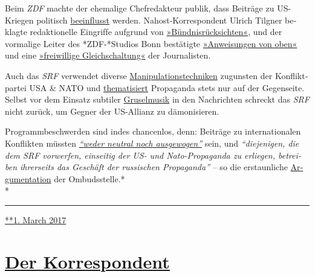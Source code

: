 Beim \emph{ZDF} machte der ehe­ma­lige Chef­re­dakteur publik, dass
Bei­träge zu US-Kriegen poli­tisch
\href{https://www.youtube.com/watch?v=i2423aDq_hE}{be­ein­f‌‌lusst}
werden. Nahost-Kor­res­pon­dent Ulrich Tilgner be­klagte
re­dak­tio­nelle Ein­grif‌fe aufgrund von
\href{http://www.berliner-zeitung.de/korrespondent-ulrich-tilgner-sucht-mehr-distanz-zum-zdf--ich-fuehle-mich-eingeschraenkt--15870684}{»Bünd­nis­rück­sich­ten«},
und der vormalige Leiter des *ZDF-*Studios Bonn be­stä­tig­te
\href{https://propagandaschau.wordpress.com/2016/01/30/wolfgang-herles-es-gibt-in-den-oeffentlich-rechtlichen-anweisungen-von-oben/}{»An­wei­sungen
von oben«} und eine
\href{http://www.rolandtichy.de/daili-es-sentials/meinungsfreiheit-anordnung-zur-anpassung/}{»frei­willige
Gleich­schal­tung«} der Jour­na­lis­ten.

Auch das \emph{SRF} verwendet diverse
\href{https://swprs.org/srf-propaganda-analyse/}{Mani­pu­lations­tech­niken}
zugunsten der Konflikt­partei USA \& NATO und
\href{http://www.srf.ch/sendungen/srfglobal/propagandagruesse-aus-moskau-2}{thematisiert}
Propaganda stets nur auf der Gegenseite. Selbst vor dem Einsatz
sub­tiler
\href{http://www.srf.ch/play/tv/10vor10/video/warum-assad-bleibt?id=a6d267c9-52b3-470b-868e-95bb919a0b96}{Grusel­musik}
in den Nach­rich­ten schreckt das \emph{SRF} nicht zurück, um Gegner der
US-Allianz zu dämo­ni­sieren.

Programmbe­schwer­den sind indes chan­cen­los, denn: Beiträge zu
inter­na­tio­nalen Kon­flik­ten müssten
\emph{\href{https://swprs.org/srf-ombudsstelle-im-faktencheck/}{``weder
neutral noch ausgewogen''}} sein, und \emph{``die­je­ni­gen, die dem SRF
vor­wer­fen, ein­sei­tig der US- und Nato-Pro­pa­gan­da zu er­lie­gen,
be­trei­ben ihrer­seits das Ge­schäf‌t der russischen Pro­pa­ganda''} --
so die erstaun­liche
\href{https://swprs.org/srf-ombudsstelle-im-faktencheck/}{Ar­gu­men­ta­tion}
der Om­buds­stelle.*\\
*

\begin{center}\rule{0.5\linewidth}{\linethickness}\end{center}

\href{https://swprs.org/2017/03/01/propaganda-im-staatsauftrag/}{**1.
March 2017}

\hypertarget{der-korrespondent}{%
\section{\texorpdfstring{\href{https://swprs.org/2017/03/01/der-korrespondent/}{Der
Korrespondent}}{Der Korrespondent}}\label{der-korrespondent}}

